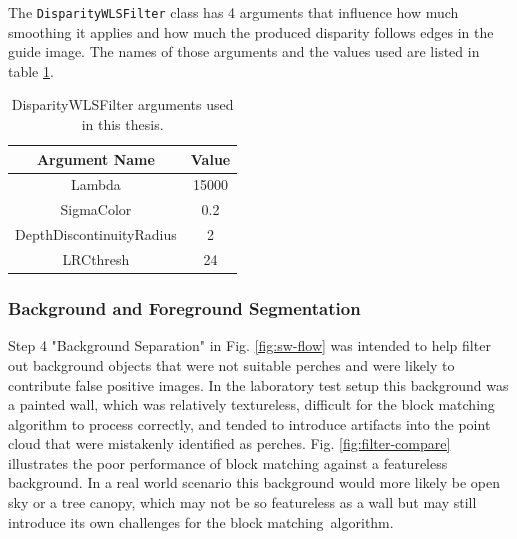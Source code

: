 The \texttt{DisparityWLSFilter} class has 4 arguments that influence how much smoothing it applies and how much the produced disparity follows edges
in the guide image. The names of those arguments and the values used are listed in table \ref{tab:wls-filter-args}.

\begin{table}[H]
    \centering
    \caption{DisparityWLSFilter arguments used in this thesis.}
    \label{tab:wls-filter-args}
    \begin{tabular}{|c||c|}
        \hline
        Argument Name & Value \\
        \hline
        Lambda & 15000 \\
        SigmaColor & 0.2 \\
        DepthDiscontinuityRadius & 2 \\
        LRCthresh & 24 \\
        \hline
    \end{tabular}
\end{table}

\subsubsection{Background and Foreground Segmentation}

Step 4 "Background Separation" in Fig. \ref{fig:sw-flow} was intended to help filter out background objects that were not suitable perches and 
were likely to contribute false positive images. In the laboratory test setup this background was a painted wall,
which was relatively textureless, difficult for the block matching algorithm to process correctly, 
and tended to introduce artifacts into the point cloud that were mistakenly identified as perches. 
Fig. \ref{fig:filter-compare} illustrates the poor performance of block matching against a featureless background.
In a real world scenario this background would more likely be open sky or a tree canopy, which may not be so featureless as a wall
but may still introduce its own challenges for the block matching~algorithm.

